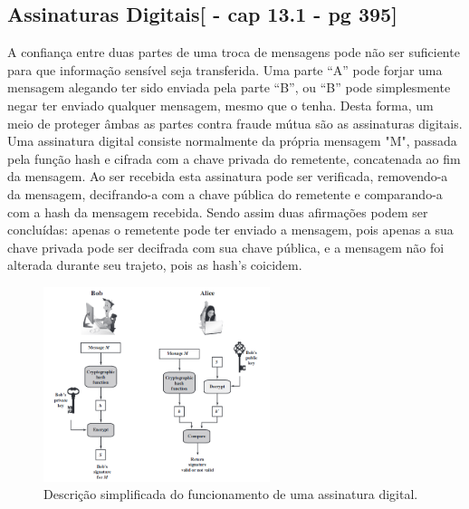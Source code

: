 \documentclass{article}
\begin{document}
		\subsection{Assinaturas Digitais[\cite{STALLINS} - cap 13.1 - pg 395]}
			\begin{justify}
			

				\hspace{2cm}A confiança entre duas partes de uma troca de mensagens pode não ser suficiente para que informação sensível seja transferida. Uma parte “A” pode forjar uma mensagem alegando ter sido enviada pela parte “B”, ou “B” pode simplesmente negar ter enviado qualquer mensagem, mesmo que o tenha. Desta forma, um meio de proteger âmbas as partes contra fraude mútua são as assinaturas digitais.
		Uma assinatura digital consiste normalmente da própria mensagem "M", passada pela função hash e cifrada com a chave privada do remetente, concatenada ao fim da mensagem. Ao ser recebida esta assinatura pode ser verificada, removendo-a da mensagem, decifrando-a com a chave pública do remetente e comparando-a com a hash da mensagem recebida. Sendo assim duas afirmações podem ser concluídas: apenas o remetente pode ter enviado a mensagem, pois apenas a sua chave privada pode ser decifrada com sua chave pública, e a mensagem não foi alterada durante seu trajeto, pois as hash's coicidem.
			
			
			\end{justify}


		\begin{figure}[hb!]
			\centering
			\includegraphics[width=250px]{AssinaturaDigital.png}
			\caption{Descrição simplificada do funcionamento de uma assinatura digital.}
			\label{fig:digiSign}

		\end{figure}
\end{document}
